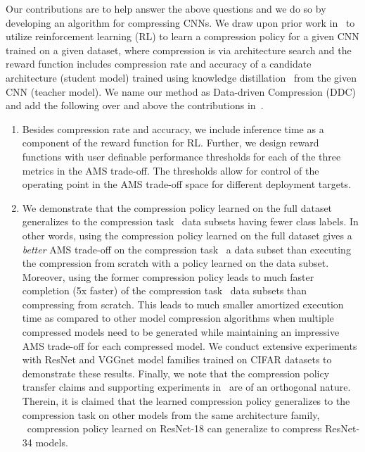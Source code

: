 \documentclass[../main]{subfiles}
\begin{document}
    Our contributions are to help answer the above questions and we do so by developing an algorithm for compressing CNNs.
    We draw upon prior work in~\cite{ashok2017n2n} to utilize reinforcement learning (RL) to learn a compression policy for a given CNN trained on a given dataset, where compression is via architecture search and the reward function includes compression rate and accuracy of a candidate architecture (student model) trained using knowledge distillation~\cite{hinton2015distilling,romero2014fitnets} from the given CNN (teacher model).
    We name our method as Data-driven Compression (DDC) and add the following over and above the contributions in~\cite{ashok2017n2n}.
    \begin{enumerate}
	    \item	Besides compression rate and accuracy, we include inference time as a component of the reward function for RL.
	    Further, we design reward functions with user definable performance thresholds for each of the three metrics in the AMS trade-off.
	    The thresholds allow for control of the operating point in the AMS trade-off space for different deployment targets.
	    \item	We demonstrate that the compression policy learned on the full dataset generalizes to the compression task \wrt~data subsets having fewer class labels.
	    In other words, using the compression policy learned on the full dataset gives a \emph{better} AMS trade-off on the compression task \wrt~a data subset than executing the compression from scratch with a policy learned on the data subset.
	    Moreover, using the former compression policy leads to much faster completion (5x faster) of the compression task \wrt~data subsets than compressing from scratch.
	    This leads to much smaller amortized execution time as compared to other model compression algorithms when multiple compressed models need to be generated while maintaining an impressive AMS trade-off for each compressed model.
	    We conduct extensive experiments with ResNet and VGGnet model families trained on CIFAR datasets to demonstrate these results.
	    Finally, we note that the compression policy transfer claims and supporting experiments in~\cite{ashok2017n2n} are of an orthogonal nature.
	    Therein, it is claimed that the learned compression policy generalizes to the compression task on other models from the same architecture family, \eg~compression policy learned on ResNet-18 can generalize to compress ResNet-34 models.%
    \end{enumerate}
    
\end{document}
